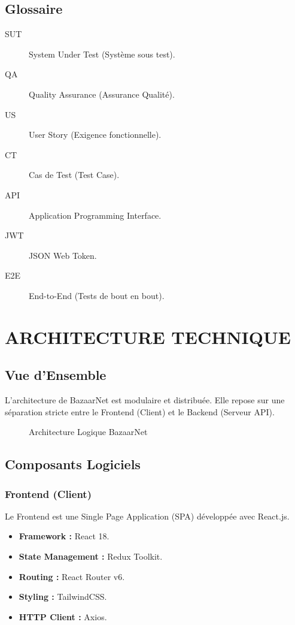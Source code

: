 \documentclass[12pt,a4paper]{article}
\begin{document}
\subsection{Glossaire}
\begin{description}
    \item[SUT] System Under Test (Système sous test).
    \item[QA] Quality Assurance (Assurance Qualité).
    \item[US] User Story (Exigence fonctionnelle).
    \item[CT] Cas de Test (Test Case).
    \item[API] Application Programming Interface.
    \item[JWT] JSON Web Token.
    \item[E2E] End-to-End (Tests de bout en bout).
\end{description}

\section{ARCHITECTURE TECHNIQUE}

\subsection{Vue d'Ensemble}
L'architecture de BazaarNet est modulaire et distribuée. Elle repose sur une séparation stricte entre le Frontend (Client) et le Backend (Serveur API).

\begin{figure}[H]
    \centering
    \caption{Architecture Logique BazaarNet}
\end{figure}

\subsection{Composants Logiciels}

\subsubsection{Frontend (Client)}
Le Frontend est une Single Page Application (SPA) développée avec React.js.
\begin{itemize}
    \item \textbf{Framework :} React 18.
    \item \textbf{State Management :} Redux Toolkit.
    \item \textbf{Routing :} React Router v6.
    \item \textbf{Styling :} TailwindCSS.
    \item \textbf{HTTP Client :} Axios.
\end{itemize}
\end{document}
